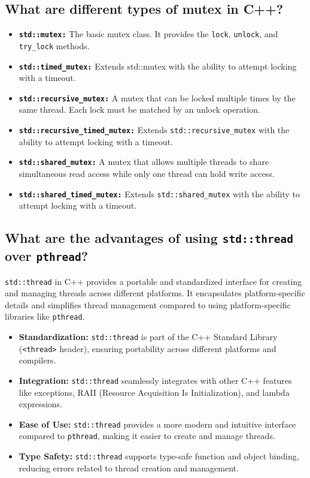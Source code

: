 \subsection{What are different types of mutex in C++?}
\begin{itemize}
    \item \textbf{\texttt{std::mutex:}} The basic mutex class. It provides the \texttt{lock}, \texttt{unlock}, and \texttt{try\_lock} methods.
    \item \textbf{\texttt{std::timed\_mutex:}} Extends std::mutex with the ability to attempt locking with a timeout.
    \item \textbf{\texttt{std::recursive\_mutex:}} A mutex that can be locked multiple times by the same thread. Each lock must be matched by an unlock operation.
    \item \textbf{\texttt{std::recursive\_timed\_mutex:}} Extends \texttt{std::recursive\_mutex} with the ability to attempt locking with a timeout.
    \item \textbf{\texttt{std::shared\_mutex:}} A mutex that allows multiple threads to share simultaneous read access while only one thread can hold write access.
    \item \textbf{\texttt{std::shared\_timed\_mutex:}} Extends \texttt{std::shared\_mutex} with the ability to attempt locking with a timeout.
\end{itemize}

\subsection{What are the advantages of using \texttt{std::thread} over \texttt{pthread}?}
\texttt{std::thread} in C++ provides a portable and standardized interface for creating and managing threads across different platforms. It encapsulates platform-specific details and simplifies thread management compared to using platform-specific libraries like \texttt{pthread}.
\begin{itemize}
    \item \textbf{Standardization:} \texttt{std::thread} is part of the C++ Standard Library (\texttt{<thread>} header), ensuring portability across different platforms and compilers.
    \item \textbf{Integration:} \texttt{std::thread} seamlessly integrates with other C++ features like exceptions, RAII (Resource Acquisition Is Initialization), and lambda expressions.
    \item \textbf{Ease of Use:} \texttt{std::thread} provides a more modern and intuitive interface compared to \texttt{pthread}, making it easier to create and manage threads.
    \item \textbf{Type Safety:} \texttt{std::thread} supports type-safe function and object binding, reducing errors related to thread creation and management.
\end{itemize}

